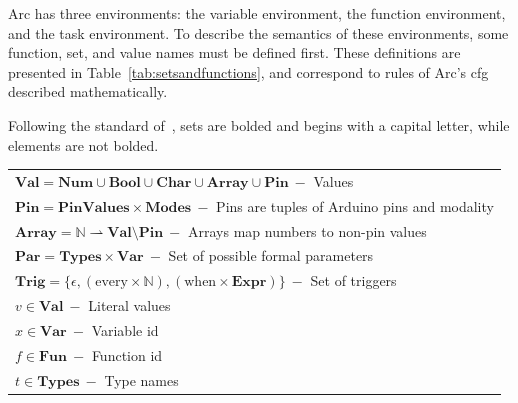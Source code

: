 Arc has three environments: the variable environment, the function environment, and the task environment. To describe the semantics of these environments, some function, set, and value names must be defined first. These definitions are presented in Table~\ref{tab:setsandfunctions}, and correspond to rules of Arc's \gls{cfg} described mathematically.

Following the standard of~\cite{Huttel2010}, sets are bolded and begins with a capital letter, while elements are not bolded.


\begin{table}[htb!]
    \centering
    \begin{tabular}{l}
        \toprule
        $\textbf{Val} = \textbf{Num} \cup \textbf{Bool} \cup \textbf{Char} \cup \textbf{Array} \cup \textbf{Pin}\ -$ Values                                            \\
        $\textbf{Pin} = \textbf{PinValues} \times \textbf{Modes}\ -$ Pins are tuples of Arduino pins and modality                                                      \\
        $\textbf{Array} = \mathbb{N} \rightharpoonup \textbf{Val} \setminus \textbf{Pin}\ -$ Arrays map numbers to non-pin values                                      \\
        $\textbf{Par} = \textbf{Types} \times \textbf{Var}\ -$ Set of possible formal parameters                                                                       \\
        $\textbf{Trig} = \{\epsilon, (\text{every} \times \mathbb{N}), (\text{when} \times \textbf{Expr}) \}\ -$ Set of triggers                                       \\
        $v \in \textbf{Val}\ -$ Literal values                                                                                                                         \\
        $x \in \textbf{Var}\ -$ Variable id                                                                                                                            \\
        $f \in \textbf{Fun}\ -$ Function id                                                                                                                            \\
        $t \in \textbf{Types}\ -$ Type names                                                                                                                           \\

\end{tabular}
\end{table}
